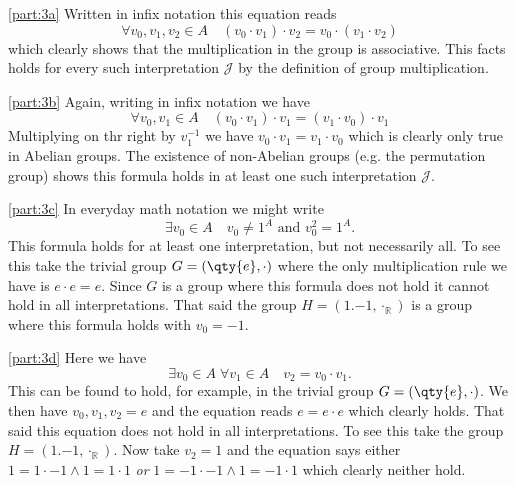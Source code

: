 \documentclass[boxes,pages,color=CornflowerBlue]{homework}
\begin{document}
\begin{solution}
    \ref{part:3a}
    Written in infix notation this equation reads
    \begin{equation*}
        \forall v_0, v_1, v_2 \in A \quad (v_0 \cdot v_1) \cdot v_2 = v_0 \cdot (v_1 \cdot v_2)
    \end{equation*}
    which clearly shows that the multiplication in the group is associative.
    This facts holds for every such interpretation $\mathcal{J}$ by the definition of group multiplication.

    \ref{part:3b}
    Again, writing in infix notation we have
    \begin{equation*}
        \forall v_0, v_1 \in A \quad (v_0 \cdot v_1) \cdot v_1 = (v_1 \cdot v_0) \cdot v_1
    \end{equation*}
    Multiplying on thr right by $v_1^{-1}$ we have $v_0\cdot v_1 = v_1 \cdot v_0$ which is clearly only true in Abelian groups.
    The existence of non-Abelian groups (e.g. the permutation group) shows this formula holds in at least one such interpretation $\mathcal{J}$.

    \ref{part:3c}
    In everyday math notation we might write
    \begin{equation*}
        \exists v_0 \in A \quad v_0 \neq 1^A \text{ and } v_0^2 = 1^A.
    \end{equation*}
    This formula holds for at least one interpretation, but not necessarily all.
    To see this take the trivial group $G = (\qty{e}, \cdot)$ where the only multiplication rule we have is $e \cdot e = e$.
    Since $G$ is a group where this formula does not hold it cannot hold in all interpretations.
    That said the group $H = (\qty{1, -1}, \cdot_\mathbb{R})$ is a group where this formula holds with $v_0 = -1$.

    \ref{part:3d}
    Here we have
    \begin{equation*}
        \exists v_0\in A \; \forall v_1 \in A \quad v_2 = v_0 \cdot v_1.
    \end{equation*}
    This can be found to hold, for example, in the trivial group $G = (\qty{e}, \cdot)$.
    We then have $v_0, v_1, v_2 = e$ and the equation reads $e = e\cdot e$ which clearly holds.
    That said this equation does not hold in all interpretations.
    To see this take the group $H = (\qty{1, -1}, \cdot_\mathbb{R})$.
    Now take $v_2 = 1$ and the equation says either $1 = 1 \cdot -1 \wedge 1 = 1\cdot 1$ \emph{or} $1 = -1\cdot -1 \wedge 1 = -1\cdot 1$ which clearly neither hold.


\end{solution}
\end{document}
